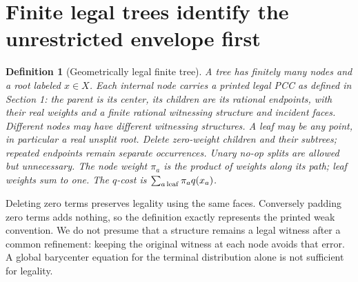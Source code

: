 \documentclass[11pt]{article}
\newtheorem{definition}[theorem]{Definition}
\begin{document}
\section{Finite legal trees identify the unrestricted envelope first}
\begin{definition}[Geometrically legal finite tree]
A tree has finitely many nodes and a root labeled $x\in X$. Each internal node carries a printed legal PCC as defined in Section 1: the parent is its center, its children are its rational endpoints, with their real weights and a finite rational witnessing structure and incident faces. Different nodes may have different witnessing structures. A leaf may be any point, in particular a real unsplit root. Delete zero-weight children and their subtrees; repeated endpoints remain separate occurrences. Unary no-op splits are allowed but unnecessary. The node weight $\pi_a$ is the product of weights along its path; leaf weights sum to one. The $q$-cost is $\sum_{a\,\rm leaf}\pi_a q(x_a)$.
\end{definition}
Deleting zero terms preserves legality using the same faces. Conversely padding zero terms adds nothing, so the definition exactly represents the printed weak convention. We do not presume that a structure remains a legal witness after a common refinement: keeping the original witness at each node avoids that error. A global barycenter equation for the terminal distribution alone is not sufficient for legality.
\end{document}
